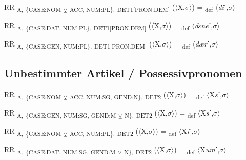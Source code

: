 {\begin{exe}
 RR \textsubscript{A,} \textsubscript{\{CASE:NOM} \textsubscript{${\veebar}$}\textsubscript{ ACC, NUM:PL\},} \textsubscript{DET1[PRON.DEM]} ($\langle$X,$\sigma $$\rangle$) = \textsubscript{def} $\langle$\textit{di}ˊ,$\sigma $$\rangle$
\end{exe}

\begin{exe}
 RR \textsubscript{A,} \textsubscript{\{CASE:DAT, NUM:PL\},} \textsubscript{DET1[PRON.DEM]} ($\langle$X,$\sigma $$\rangle$) = \textsubscript{def} $\langle$\textit{dɛne}ˊ,$\sigma $$\rangle$
\end{exe}

\begin{exe}
 RR \textsubscript{A,} \textsubscript{\{CASE:GEN, NUM:PL\},} \textsubscript{DET1[PRON.DEM]} ($\langle$X,$\sigma $$\rangle$) = \textsubscript{def} $\langle$\textit{dær}ˊ,$\sigma $$\rangle$
\end{exe}

\subsection{Unbestimmter Artikel / Possessivpronomen}

\begin{exe}
 RR \textsubscript{A,} \textsubscript{\{CASE:NOM} \textsubscript{${\veebar}$}\textsubscript{ ACC, NUM:SG, GEND:N\},} \textsubscript{DET2} ($\langle$X,$\sigma $$\rangle$) = \textsubscript{def} $\langle$X\textit{s}ˊ,$\sigma $$\rangle$
\end{exe}

\begin{exe}
 RR \textsubscript{A,} \textsubscript{\{CASE:GEN, NUM:SG, GEND:M} \textsubscript{${\veebar}$}\textsubscript{ N\},} \textsubscript{DET2} ($\langle$X,$\sigma $$\rangle$) = \textsubscript{def} $\langle$X\textit{s}ˊ,$\sigma $$\rangle$
\end{exe}

\begin{exe}
 RR \textsubscript{A,} \textsubscript{\{CASE:NOM} \textsubscript{${\veebar}$}\textsubscript{ ACC, NUM:PL\},} \textsubscript{DET2} ($\langle$X,$\sigma $$\rangle$) = \textsubscript{def} $\langle$X\textit{i}ˊ,$\sigma $$\rangle$
\end{exe}

\begin{exe}
 RR \textsubscript{A,} \textsubscript{\{CASE:DAT, NUM:SG, GEND:M} \textsubscript{${\veebar}$}\textsubscript{ N\},} \textsubscript{DET2} ($\langle$X,$\sigma $$\rangle$) = \textsubscript{def} $\langle$X\textit{um}ˊ,$\sigma $$\rangle$
\end{exe}

}
